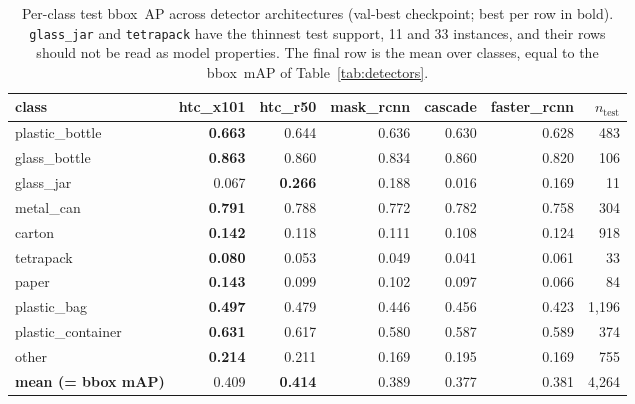 \begin{table}[tb]
\centering
\small
\caption{Per-class test bbox~AP across detector architectures
(val-best checkpoint; best per row in bold). \texttt{glass\_jar} and
\texttt{tetrapack} have the thinnest test support, 11 and 33
instances, and their rows should not be read as model properties. The
final row is the mean over classes, equal to the bbox~mAP of
Table~\ref{tab:detectors}.}
\label{tab:perclass}
\begin{tabular}{lrrrrrr}
\toprule
class & htc\_x101 & htc\_r50 & mask\_rcnn & cascade & faster\_rcnn & $n_{\text{test}}$ \\
\midrule
plastic\_bottle    & \textbf{0.663} & 0.644 & 0.636 & 0.630 & 0.628 & 483 \\
glass\_bottle      & \textbf{0.863} & 0.860 & 0.834 & 0.860 & 0.820 & 106 \\
glass\_jar         & 0.067 & \textbf{0.266} & 0.188 & 0.016 & 0.169 & 11 \\
metal\_can         & \textbf{0.791} & 0.788 & 0.772 & 0.782 & 0.758 & 304 \\
carton             & \textbf{0.142} & 0.118 & 0.111 & 0.108 & 0.124 & 918 \\
tetrapack          & \textbf{0.080} & 0.053 & 0.049 & 0.041 & 0.061 & 33 \\
paper              & \textbf{0.143} & 0.099 & 0.102 & 0.097 & 0.066 & 84 \\
plastic\_bag       & \textbf{0.497} & 0.479 & 0.446 & 0.456 & 0.423 & 1,196 \\
plastic\_container & \textbf{0.631} & 0.617 & 0.580 & 0.587 & 0.589 & 374 \\
other              & \textbf{0.214} & 0.211 & 0.169 & 0.195 & 0.169 & 755 \\
\midrule
\textbf{mean (= bbox mAP)} & 0.409 & \textbf{0.414} & 0.389 & 0.377 & 0.381 & 4,264 \\
\bottomrule
\end{tabular}
\end{table}
